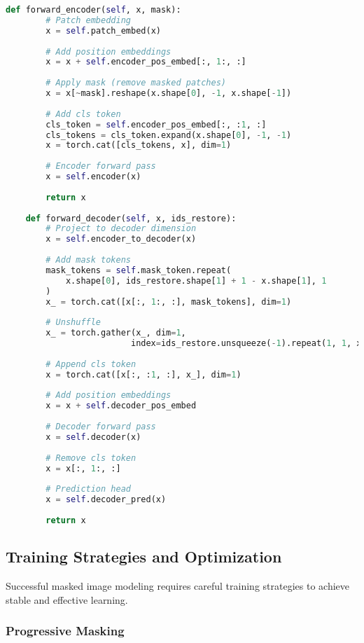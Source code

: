 \begin{lstlisting}[language=Python, caption=Asymmetric MAE architecture implementation]
    def forward_encoder(self, x, mask):
        # Patch embedding
        x = self.patch_embed(x)
        
        # Add position embeddings
        x = x + self.encoder_pos_embed[:, 1:, :]
        
        # Apply mask (remove masked patches)
        x = x[~mask].reshape(x.shape[0], -1, x.shape[-1])
        
        # Add cls token
        cls_token = self.encoder_pos_embed[:, :1, :] 
        cls_tokens = cls_token.expand(x.shape[0], -1, -1)
        x = torch.cat([cls_tokens, x], dim=1)
        
        # Encoder forward pass
        x = self.encoder(x)
        
        return x
    
    def forward_decoder(self, x, ids_restore):
        # Project to decoder dimension
        x = self.encoder_to_decoder(x)
        
        # Add mask tokens
        mask_tokens = self.mask_token.repeat(
            x.shape[0], ids_restore.shape[1] + 1 - x.shape[1], 1
        )
        x_ = torch.cat([x[:, 1:, :], mask_tokens], dim=1)
        
        # Unshuffle
        x_ = torch.gather(x_, dim=1, 
                         index=ids_restore.unsqueeze(-1).repeat(1, 1, x.shape[2]))
        
        # Append cls token
        x = torch.cat([x[:, :1, :], x_], dim=1)
        
        # Add position embeddings
        x = x + self.decoder_pos_embed
        
        # Decoder forward pass
        x = self.decoder(x)
        
        # Remove cls token
        x = x[:, 1:, :]
        
        # Prediction head
        x = self.decoder_pred(x)
        
        return x
\end{lstlisting}

\subsection{Training Strategies and Optimization}

Successful masked image modeling requires careful training strategies to achieve stable and effective learning.

\subsubsection{Progressive Masking}

